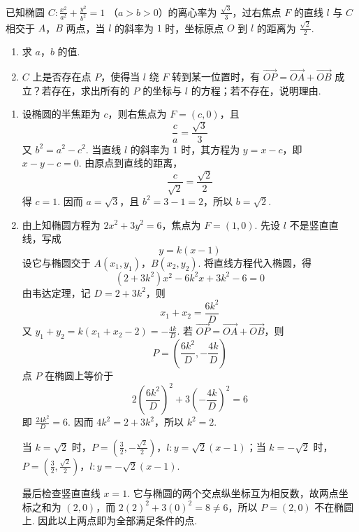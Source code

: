 \begin{problem}
已知椭圆 \(C: \frac{x^2}{a^2} + \frac{y^2}{b^2} = 1 \) （\(a > b > 0\)）的离心率为 \(\frac{\sqrt{3}}{3}\)，过右焦点 \(F\) 的直线 \(l\) 与 \(C\) 相交于 \(A\)，\(B\) 两点，当 \(l\) 的斜率为 \(1\) 时，坐标原点 \(O\) 到 \(l\) 的距离为 \(\frac{\sqrt{2}}{2}\).

\begin{enumerate}
\item 求 \(a\)，\(b\) 的值.
\item \(C\) 上是否存在点 \(P\)，使得当 \(l\) 绕 \(F\) 转到某一位置时，有 \(\overrightarrow{OP} = \overrightarrow{OA} + \overrightarrow{OB}\) 成立？若存在，求出所有的 \(P\) 的坐标与 \(l\) 的方程；若不存在，说明理由.
\end{enumerate}

\begin{solution}
\begin{enumerate}
\item 设椭圆的半焦距为 \(c\)，则右焦点为 \(F=(c,0)\)，且
\[
\frac{c}{a}=\frac{\sqrt3}{3}
\]
又 \(b^{2}=a^{2}-c^{2}\).
当直线 \(l\) 的斜率为 \(1\) 时，其方程为 \(y=x-c\)，即 \(x-y-c=0\). 由原点到直线的距离，
\[
\frac{c}{\sqrt2}=\frac{\sqrt2}{2}
\]
得 \(c=1\). 因而 \(a=\sqrt3\)，且 \(b^{2}=3-1=2\)，所以 \(b=\sqrt2\).
\item 由上知椭圆方程为 \(2x^{2}+3y^{2}=6\)，焦点为 \(F=(1,0)\). 先设 \(l\) 不是竖直直线，写成
\[
y=k(x-1)
\]
设它与椭圆交于 \(A(x_{1},y_{1})\)，\(B(x_{2},y_{2})\). 将直线方程代入椭圆，得
\[
(2+3k^{2})x^{2}-6k^{2}x+3k^{2}-6=0
\]
由韦达定理，记 \(D=2+3k^{2}\)，则
\[
x_{1}+x_{2}=\frac{6k^{2}}{D}
\]
又 \(y_{1}+y_{2}=k(x_{1}+x_{2}-2)=-\frac{4k}{D}\).
若 \(\overrightarrow{OP}=\overrightarrow{OA}+\overrightarrow{OB}\)，则
\[
P=\left(\frac{6k^{2}}{D},-\frac{4k}{D}\right)
\]
点 \(P\) 在椭圆上等价于
\[
2\left(\frac{6k^{2}}{D}\right)^{2}+3\left(-\frac{4k}{D}\right)^{2}=6
\]
即 \(\frac{24k^{2}}{D}=6\). 因而 \(4k^{2}=2+3k^{2}\)，所以 \(k^{2}=2\).

当 \(k=\sqrt2\) 时，\(P=\left(\frac32,-\frac{\sqrt2}{2}\right)\)，\(l:y=\sqrt2(x-1)\)；当 \(k=-\sqrt2\) 时，\(P=\left(\frac32,\frac{\sqrt2}{2}\right)\)，\(l:y=-\sqrt2(x-1)\).

最后检查竖直直线 \(x=1\). 它与椭圆的两个交点纵坐标互为相反数，故两点坐标之和为 \((2,0)\)，而 \(2(2)^{2}+3(0)^{2}=8\ne6\)，所以 \(P=(2,0)\) 不在椭圆上. 因此以上两点即为全部满足条件的点.
\end{enumerate}
\end{solution}
\end{problem}

